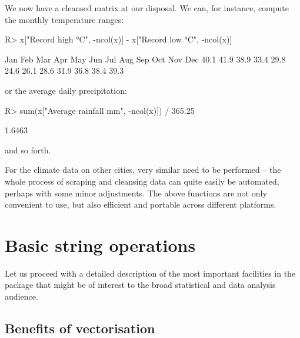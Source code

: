 \documentclass[nojss]{jss}\usepackage[]{graphicx}\usepackage[]{color}
\begin{document}
We now have a cleansed matrix at our disposal.
We can, for instance, compute the monthly temperature ranges:

\begin{Schunk}
\begin{Sinput}
R> x["Record high °C", -ncol(x)] - x["Record low °C", -ncol(x)]
\end{Sinput}
\begin{Soutput}
 Jan  Feb  Mar  Apr  May  Jun  Jul  Aug  Sep  Oct  Nov  Dec
40.1 41.9 38.9 33.4 29.8 24.6 26.1 28.6 31.9 36.8 38.4 39.3
\end{Soutput}
\end{Schunk}

\noindent
or the average daily precipitation:

\begin{Schunk}
\begin{Sinput}
R> sum(x["Average rainfall mm", -ncol(x)]) / 365.25
\end{Sinput}
\begin{Soutput}
[1] 1.6463
\end{Soutput}
\end{Schunk}

\noindent
and so forth.

For the climate data on other cities, very similar need to be performed --
the whole process of scraping and cleansing data
can quite easily be automated, perhaps with some minor adjustments.
The above functions are not only convenient to use, but also efficient
and portable across different platforms.




\section{Basic string operations}\label{Sec:basic}

Let us proceed with a detailed description of the most important
facilities in the  package that might be of interest to
the broad statistical and data analysis audience.

\subsection{Benefits of vectorisation}
\end{document}
